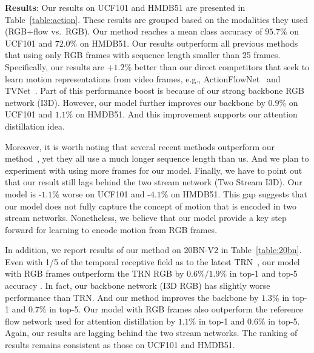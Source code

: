 \documentclass[10pt,twocolumn,letterpaper]{article}
\begin{document}
\noindent \textbf{Results}: Our results on UCF101 and HMDB51 are presented in Table~\ref{table:action}. These results are grouped based on the modalities they used (RGB+flow vs.\ RGB). Our method reaches a mean class accuracy of $95.7\%$ on UCF101 and $72.0\%$ on HMDB51. Our results outperform all previous methods that using only RGB frames with sequence length smaller than 25 frames. Specifically, our results are +$1.2\%$ better than our direct competitors that seek to learn motion representations from video frames, e.g., ActionFlowNet~\cite{ng2016actionflownet} and TVNet~\cite{fan2018end}. Part of this performance boost is because of our strong backbone RGB network (I3D). However, our model further improves our backbone by $0.9\%$ on UCF101 and $1.1\%$ on HMDB51. And this improvement supports our attention distillation idea. 

Moreover, it is worth noting that several recent methods outperform our method~\cite{carreira2017quo,Xie_2018_ECCV,Tran_2018_CVPR}, yet they all use a much longer sequence length than us. And we plan to experiment with using more frames for our model. Finally, we have to point out that our result still lags behind the two stream network (Two Stream I3D). Our model is -$1.1\%$ worse on UCF101 and -$4.1\%$ on HMDB51. This gap suggests that our model does not fully capture the concept of motion that is encoded in two stream networks. Nonetheless, we believe that our model provide a key step forward for learning to encode motion from RGB frames. 

In addition, we report results of our method on 20BN-V2 in Table~\ref{table:20bn}. Even with 1/5 of the temporal receptive field as to the latest TRN~\cite{zhou2017temporal}, our model with RGB frames outperform the TRN RGB by $0.6\%/1.9\%$ in top-1 and top-5 accuracy . In fact, our backbone network (I3D RGB) has slightly worse performance than TRN. And our method improves the backbone by $1.3\%$ in top-1 and $0.7\%$ in top-5. Our model with RGB frames also outperform the reference flow network used for attention distillation by $1.1\%$ in top-1 and $0.6\%$ in top-5. Again, our results are lagging behind the two stream networks. The ranking of results remains consistent as those on UCF101 and HMDB51.
\end{document}
